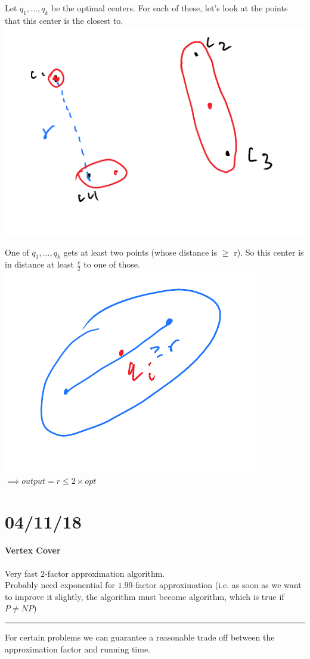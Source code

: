 \documentclass[12 pt]{article}
\begin{document}
          Let $q_1,\ldots,q_k$ be the optimal centers. For each of
          these, let's look at the points that this center is the
          closest to.
          \\ \includegraphics[width=.9\textwidth]{i158.pdf}

          One of $q_1,\ldots, q_k$ gets at least two points (whose
          distance is $\geq$ r). So this center is in distance at
          least $\frac{r}{2}$ to one of those.
          \\ \includegraphics[width=.6\textwidth]{i159.pdf}
          \\ $\implies output = r \leq 2 \times opt$
          \section{04/11/18}
          \paragraph{Vertex Cover}
          Very fast $2$-factor approximation algorithm.
          \\ Probably need exponential for $1.99$-factor approximation
          (i.e. as soon as we want to improve it slightly, the
          algorithm must become algorithm, which is true if $P\neq NP$)
          \\ \noindent \rule{\textwidth}{0.5pt}
          For certain problems we can guarantee a reasonable trade off
          between the approximation factor and running time.
\end{document}
